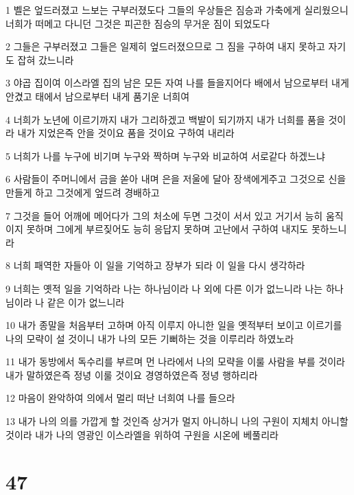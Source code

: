 \par 1 벨은 엎드러졌고 느보는 구부러졌도다 그들의 우상들은 짐승과 가축에게 실리웠으니 너희가 떠메고 다니던 그것은 피곤한 짐승의 무거운 짐이 되었도다
\par 2 그들은 구부러졌고 그들은 일제히 엎드러졌으므로 그 짐을 구하여 내지 못하고 자기도 잡혀 갔느니라
\par 3 야곱 집이여 이스라엘 집의 남은 모든 자여 나를 들을지어다 배에서 남으로부터 내게 안겼고 태에서 남으로부터 내게 품기운 너희여
\par 4 너희가 노년에 이르기까지 내가 그리하겠고 백발이 되기까지 내가 너희를 품을 것이라 내가 지었은즉 안을 것이요 품을 것이요 구하여 내리라
\par 5 너희가 나를 누구에 비기며 누구와 짝하며 누구와 비교하여 서로같다 하겠느냐
\par 6 사람들이 주머니에서 금을 쏟아 내며 은을 저울에 달아 장색에게주고 그것으로 신을 만들게 하고 그것에게 엎드려 경배하고
\par 7 그것을 들어 어깨에 메어다가 그의 처소에 두면 그것이 서서 있고 거기서 능히 움직이지 못하며 그에게 부르짖어도 능히 응답지 못하며 고난에서 구하여 내지도 못하느니라
\par 8 너희 패역한 자들아 이 일을 기억하고 장부가 되라 이 일을 다시 생각하라
\par 9 너희는 옛적 일을 기억하라 나는 하나님이라 나 외에 다른 이가 없느니라 나는 하나님이라 나 같은 이가 없느니라
\par 10 내가 종말을 처음부터 고하며 아직 이루지 아니한 일을 옛적부터 보이고 이르기를 나의 모략이 설 것이니 내가 나의 모든 기뻐하는 것을 이루리라 하였노라
\par 11 내가 동방에서 독수리를 부르며 먼 나라에서 나의 모략을 이룰 사람을 부를 것이라 내가 말하였은즉 정녕 이룰 것이요 경영하였은즉 정녕 행하리라
\par 12 마음이 완악하여 의에서 멀리 떠난 너희여 나를 들으라
\par 13 내가 나의 의를 가깝게 할 것인즉 상거가 멀지 아니하니 나의 구원이 지체치 아니할 것이라 내가 나의 영광인 이스라엘을 위하여 구원을 시온에 베풀리라

\chapter{47}

